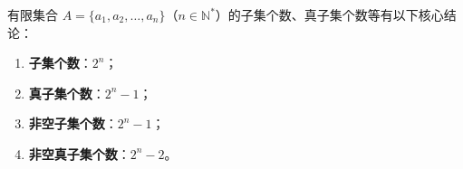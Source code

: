 \begin{statementbox}
有限集合 $A = \{a_1, a_2, \dots, a_n\}$（$n \in \mathbb{N}^*$）的子集个数、真子集个数等有以下核心结论：
\begin{enumerate}
    \item \textbf{子集个数}：$2^n$；
    \item \textbf{真子集个数}：$2^n - 1$；
    \item \textbf{非空子集个数}：$2^n - 1$；
    \item \textbf{非空真子集个数}：$2^n - 2$。
\end{enumerate}
\end{statementbox}
